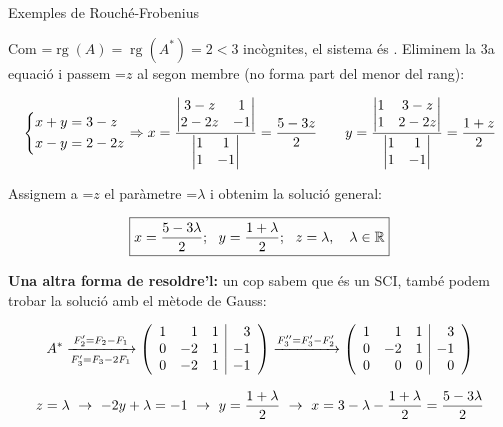 \documentclass[11pt,a4paper]{article}
\newcommand{\fmm}[1]{\setbox0=\hbox{$#1$}\ifdim\wd0>\linewidth\fmdisp{#1}\else\mbox{\box0}\fi}
\newcommand{\fmdisp}[1]{\[\setbox2=\hbox{$\displaystyle #1$}\ifdim\wd2>\linewidth\resizebox{\linewidth}{!}{\box2}\else\box2\fi\]}
\newcommand{\fmbadge}[2]{\tcbox[on line,colback=#1,colframe=#1,arc=2mm,boxsep=0pt,left=4pt,right=4pt,top=1.5pt,bottom=1.5pt]{\color{white}\footnotesize\bfseries #2}}
\begin{document}
\begin{fmex}{Exemples de Rouché-Frobenius}
\begin{enumerate}[label=\textbf{\arabic*.},leftmargin=*]
Com \fmm{\operatorname{rg}(A)=\operatorname{rg}(A^*)=2<3} incògnites, el sistema és \fmbadge{fmev}{SCI}. Eliminem la 3a equació i passem \fmm{z} al segon membre (no forma part del menor del rang):

\fmdisp{\left\{\begin{aligned}x+y&=3-z\\ x-y&=2-2z\end{aligned}\right.\Rightarrow x=\frac{\begin{vmatrix}3-z & 1\\ 2-2z & -1\end{vmatrix}}{\begin{vmatrix}1 & 1\\ 1 & -1\end{vmatrix}}=\frac{5-3z}{2}\qquad y=\frac{\begin{vmatrix}1 & 3-z\\ 1 & 2-2z\end{vmatrix}}{\begin{vmatrix}1 & 1\\ 1 & -1\end{vmatrix}}=\frac{1+z}{2}}

Assignem a \fmm{z} el paràmetre \fmm{\lambda} i obtenim la solució general:

\fmdisp{\boxed{x=\frac{5-3\lambda}{2};\ \ y=\frac{1+\lambda}{2};\ \ z=\lambda,\quad\lambda\in\mathbb{R}}}

\textbf{Una altra forma de resoldre'l:} un cop sabem que és un SCI, també podem trobar la solució amb el mètode de Gauss:

\fmdisp{A^*\xrightarrow[F_3'=F_3-2F_1]{F_2'=F_2-F_1}\left(\begin{array}{rrr|r}1 & 1 & 1 & 3\\ 0 & -2 & 1 & -1\\ 0 & -2 & 1 & -1\end{array}\right)\xrightarrow{F_3''=F_3'-F_2'}\left(\begin{array}{rrr|r}1 & 1 & 1 & 3\\ 0 & -2 & 1 & -1\\ 0 & 0 & 0 & 0\end{array}\right)}

\fmdisp{z=\lambda\ \rightarrow\ -2y+\lambda=-1\ \rightarrow\ y=\frac{1+\lambda}{2}\ \rightarrow\ x=3-\lambda-\frac{1+\lambda}{2}=\frac{5-3\lambda}{2}}

\end{enumerate}
\end{fmex}

\end{document}
